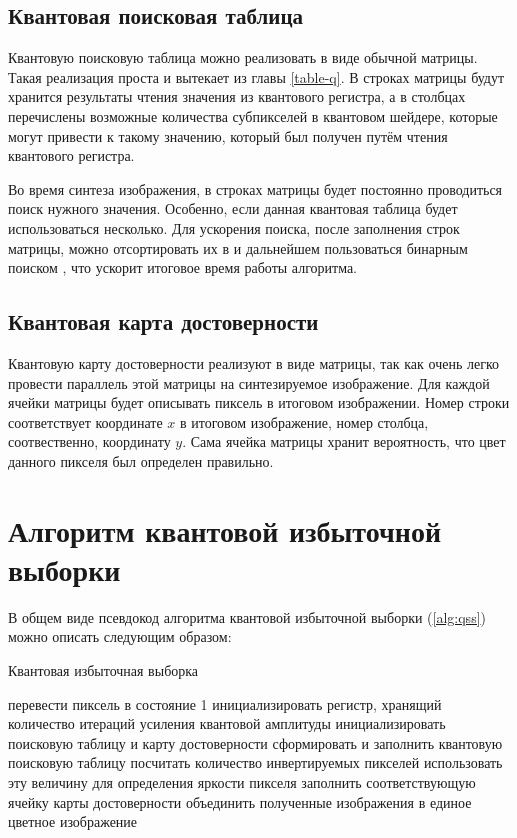 \subsection{Квантовая поисковая таблица}

Квантовую поисковую таблица можно реализовать в виде обычной матрицы. Такая реализация проста и вытекает из главы \ref{table-q}. В строках матрицы будут хранится результаты чтения значения из квантового регистра, а в столбцах перечислены возможные количества субпикселей в квантовом шейдере, которые могут привести к такому значению, который был получен путём чтения квантового регистра. 

Во время синтеза изображения, в строках матрицы будет постоянно проводиться поиск нужного значения. Особенно, если данная квантовая таблица будет использоваться несколько. Для ускорения поиска, после заполнения строк матрицы, можно отсортировать их в и дальнейшем пользоваться бинарным поиском \cite{binary-search}, что ускорит итоговое время работы алгоритма.

\subsection{Квантовая карта достоверности}

Квантовую карту достоверности реализуют в виде матрицы, так как очень легко провести параллель этой матрицы на синтезируемое изображение. Для каждой ячейки матрицы будет описывать пиксель в итоговом изображении. Номер строки соответствует координате $x$ в итоговом изображение, номер столбца, соотвественно, координату $y$. Сама ячейка матрицы хранит вероятность, что цвет данного пикселя был определен правильно.

\section{Алгоритм квантовой избыточной выборки}

В общем виде псевдокод алгоритма квантовой избыточной выборки (\ref{alg:qss}) можно описать следующим образом:

\begin{algorithm}
	\caption{Квантовая избыточная выборка}
	\label{alg:qss}
	\begin{algorithmic}[1]
				\State перевести пиксель в состояние 1
			\EndFor
			\State инициализировать регистр, хранящий количество итераций усиления квантовой амплитуды
			\State инициализировать поисковую таблицу и карту достоверности
			\State сформировать и заполнить квантовую поисковую таблицу
				\State посчитать количество инвертируемых пикселей 
				\State использовать эту величину для определения яркости пикселя
				\State заполнить соответствующую ячейку карты достоверности
			\EndFor
		\EndFor
		\State объединить полученные изображения в единое цветное изображение
	\end{algorithmic}
\end{algorithm}

